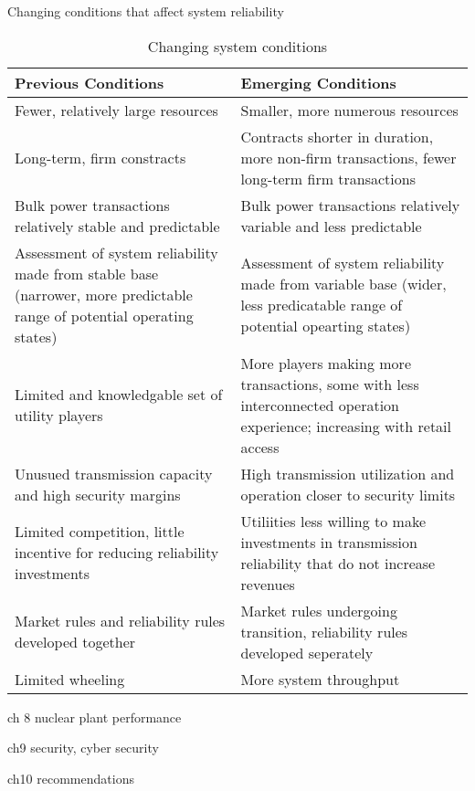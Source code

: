 Changing conditions that affect system reliability
\begin{center}
\begin{table}
\begin{tabular}{| p{7cm} | p{7cm} |}
\hline
Previous Conditions 	&	Emerging Conditions 		\\	\hline  	\hline
Fewer, relatively large resources	&	Smaller, more numerous resources		\\	\hline
Long-term, firm constracts 	&	Contracts shorter in duration, more non-firm transactions, fewer long-term firm transactions	\\	\hline
Bulk power transactions relatively stable and predictable	&	Bulk power transactions relatively variable and less predictable	\\	\hline
Assessment of system reliability made from stable base (narrower, more predictable range of potential operating states)	&	Assessment of system reliability made from variable base (wider, less predicatable range of potential opearting states)		\\		\hline
Limited and knowledgable set of utility players 	&	More players making more transactions, some with less interconnected operation experience; increasing with retail access	\\	\hline
Unusued transmission capacity and high security margins	&	High transmission utilization and operation closer to security limits	\\	\hline
Limited competition, little incentive for reducing reliability investments	&	Utiliities less willing to make investments in transmission reliability that do not increase revenues	\\	\hline
Market rules and reliability rules developed together	&	Market rules undergoing transition, reliability rules developed seperately	\\	\hline
Limited wheeling	&	More system throughput	\\	\hline
\end{tabular}
\caption{Changing system conditions}
\end{table}
\end{center}
ch 8 nuclear plant performance

ch9 security, cyber security

ch10 recommendations



